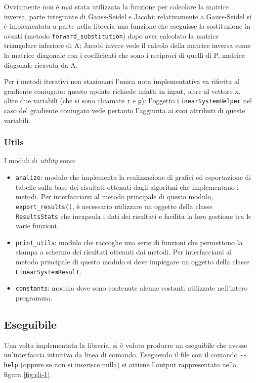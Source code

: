 \documentclass[12pt]{article}
\begin{document}
Ovviamente non è mai stata utilizzata la funzione per calcolare la matrice inversa, parte integrante di Gauss-Seidel e Jacobi: relativamente a Gauss-Seidel si è implementata a parte nella libreria una funzione che eseguisse la sostituzione in avanti (metodo \texttt{forward\_substitution}) dopo aver calcolato la matrice triangolare inferiore di A; Jacobi invece vede il calcolo della matrice inversa come la matrice diagonale con i coefficienti che sono i reciproci di quelli di P, matrice diagonale ricavata da A.

Per i metodi iterativi non stazionari l'unica nota implementativa va riferita al gradiente coniugato: questo update richiede infatti in input, oltre al vettore x, altre due variabili (che si sono chiamate \texttt{r} e \texttt{p}): l'oggetto \texttt{LinearSystemHelper} nel caso del gradiente coniugato vede pertanto l'aggiunta ai suoi attributi di queste variabili.

\subsubsection{Utils} \label{sec:utils}

I moduli di \textit{utility} sono:
\begin{itemize}
    \item \texttt{analize}: modulo che implementa la realizzazione di grafici ed esportazione di tabelle sulla base dei risultati ottenuti dagli algoritmi che implementano i metodi. Per interfacciarsi al metodo principale di questo modulo, \texttt{export\_results()}, è necessario utilizzare un oggetto della classe \texttt{ResultsStats} che incapsula i dati dei risultati e facilita la loro gestione tra le varie funzioni.
    \item \texttt{print\_utils}: modulo che raccoglie una serie di funzioni che permettono la stampa a schermo dei risultati ottenuti dai metodi. Per interfacciarsi al metodo principale di questo modulo si deve impiegare un oggetto della classe \texttt{LinearSystemResult}.
    \item \texttt{constants}: modulo dove sono contenute alcune costanti utilizzate nell'intero programma.
\end{itemize}

\subsection{Eseguibile}

Una volta implementata la libreria, si è voluto produrre un eseguibile che avesse un'interfaccia intuitiva da linea di comando. Eseguendo il file con il comando \texttt{-{}-help} (oppure se non si inserisce nulla) si ottiene l'output rappresentato nella figura \ref{fig:cli-1}.
\end{document}
